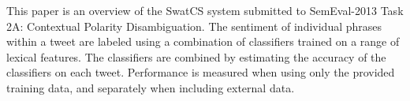 This paper is an overview of the SwatCS system submitted to SemEval-2013 Task 2A: Contextual Polarity Disambiguation. The sentiment of individual phrases
 within a tweet are labeled using a combination of classifiers trained on a
 range of lexical features. The classifiers are combined by estimating the
 accuracy of the classifiers on each tweet. Performance is measured when using
 only the provided training data, and separately when including external data.

